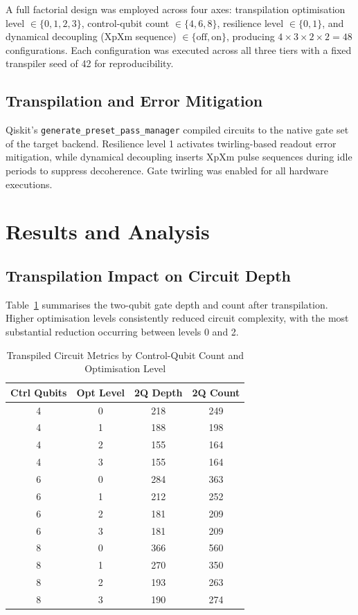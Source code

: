 \documentclass[conference]{IEEEtran}
\begin{document}
A full factorial design was employed across four axes: transpilation optimisation level $\in \{0, 1, 2, 3\}$, control-qubit count $\in \{4, 6, 8\}$, resilience level $\in \{0, 1\}$, and dynamical decoupling (XpXm sequence) $\in \{\text{off}, \text{on}\}$, producing $4 \times 3 \times 2 \times 2 = 48$ configurations. Each configuration was executed across all three tiers with a fixed transpiler seed of 42 for reproducibility.

\subsection{Transpilation and Error Mitigation}

Qiskit's \texttt{generate\_preset\_pass\_manager} compiled circuits to the native gate set of the target backend. Resilience level 1 activates twirling-based readout error mitigation, while dynamical decoupling inserts XpXm pulse sequences during idle periods to suppress decoherence. Gate twirling was enabled for all hardware executions.

\section{Results and Analysis}

\subsection{Transpilation Impact on Circuit Depth}

Table~\ref{tab:depth} summarises the two-qubit gate depth and count after transpilation. Higher optimisation levels consistently reduced circuit complexity, with the most substantial reduction occurring between levels 0 and 2.

\begin{table}[htbp]
\caption{Transpiled Circuit Metrics by Control-Qubit Count and Optimisation Level}
\begin{center}
\begin{tabular}{cccc}
\toprule
\textbf{Ctrl Qubits} & \textbf{Opt Level} & \textbf{2Q Depth} & \textbf{2Q Count} \\
\midrule
4 & 0 & 218 & 249 \\
4 & 1 & 188 & 198 \\
4 & 2 & 155 & 164 \\
4 & 3 & 155 & 164 \\
\midrule
6 & 0 & 284 & 363 \\
6 & 1 & 212 & 252 \\
6 & 2 & 181 & 209 \\
6 & 3 & 181 & 209 \\
\midrule
8 & 0 & 366 & 560 \\
8 & 1 & 270 & 350 \\
8 & 2 & 193 & 263 \\
8 & 3 & 190 & 274 \\
\bottomrule
\end{tabular}
\label{tab:depth}
\end{center}
\end{table}
\end{document}
